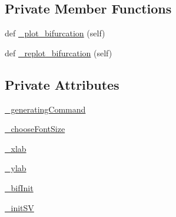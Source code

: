 \subsection*{Private Member Functions}
\begin{DoxyCompactItemize}
\item 
def \hyperlink{class_mu_mo_t_1_1_mu_mo_t_1_1_mu_mo_tbifurcation_view_a385e5f82733060fec5122635ae6a8e67}{\+\_\+plot\+\_\+bifurcation} (self)
\item 
def \hyperlink{class_mu_mo_t_1_1_mu_mo_t_1_1_mu_mo_tbifurcation_view_a13b207330e0a4fe5bb7c3b863bbd0820}{\+\_\+replot\+\_\+bifurcation} (self)
\end{DoxyCompactItemize}
\subsection*{Private Attributes}
\begin{DoxyCompactItemize}
\item 
\hyperlink{class_mu_mo_t_1_1_mu_mo_t_1_1_mu_mo_tbifurcation_view_ace48ed03490093d8f44cde91e2f1e86e}{\+\_\+generating\+Command}
\item 
\hyperlink{class_mu_mo_t_1_1_mu_mo_t_1_1_mu_mo_tbifurcation_view_a6a353a1ef9443ae375948d592ed6cec6}{\+\_\+choose\+Font\+Size}
\item 
\hyperlink{class_mu_mo_t_1_1_mu_mo_t_1_1_mu_mo_tbifurcation_view_a865b2109ba10d874e84d4a354873b121}{\+\_\+xlab}
\item 
\hyperlink{class_mu_mo_t_1_1_mu_mo_t_1_1_mu_mo_tbifurcation_view_aac1a25a634d53e524573f67eb5f3a7b9}{\+\_\+ylab}
\item 
\hyperlink{class_mu_mo_t_1_1_mu_mo_t_1_1_mu_mo_tbifurcation_view_a16ef7868ecc22fd59dcacbb01e743f80}{\+\_\+bif\+Init}
\item 
\hyperlink{class_mu_mo_t_1_1_mu_mo_t_1_1_mu_mo_tbifurcation_view_a5c3de6779b1f8c64730cee48ca65491d}{\+\_\+init\+SV}
\end{DoxyCompactItemize}
